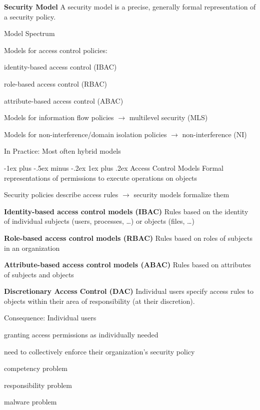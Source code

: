 \documentclass[a4paper]{article}
\makeatletter
\renewcommand{\note}[2]{\begin{noteBox} \textbf{#1} #2 \end{noteBox}}
\renewcommand{\subsubsection}{\@startsection{subsubsection}{3}{0mm}%
                {-1ex plus -.5ex minus -.2ex}%
                {1ex plus .2ex}%
                {\normalfont\small\bfseries}}
\makeatother
\begin{document}
\begin{multicols}{3}
    \note{Security Model}{A security model is a precise, generally formal representation of a security policy.}

    Model Spectrum
    \begin{itemize*}
        \item Models for access control policies:
        \begin{itemize*}
            \item identity-based access control (IBAC)
            \item role-based access control (RBAC)
            \item attribute-based access control (ABAC)
        \end{itemize*}
        \item Models for information flow policies $\rightarrow$ multilevel security (MLS)
        \item Models for non-interference/domain isolation policies $\rightarrow$ non-interference (NI)
        \item In Practice: Most often hybrid models
    \end{itemize*}

    \subsubsection{Access Control Models}
    Formal representations of permissions to execute operations on objects

    Security policies describe access rules $\rightarrow$ security models formalize them

    \note{Identity-based access control models (IBAC)}{Rules based on the identity of individual subjects (users, processes, \dots ) or objects (files, \dots)}

    \note{Role-based access control models (RBAC)}{Rules based on roles of subjects in an organization}

    \note{Attribute-based access control models (ABAC)}{Rules based on attributes of subjects and objects}

    \note{Discretionary Access Control (DAC)}{Individual users specify access rules to objects within their area of responsibility (at their discretion).}
    Consequence: Individual users
    \begin{itemize*}
        \item granting access permissions as individually needed
        \item need to collectively enforce their organization’s security policy
        \begin{itemize*}
            \item competency problem
            \item responsibility problem
            \item malware problem
        \end{itemize*}
    \end{itemize*}


\end{multicols}
\end{document}
